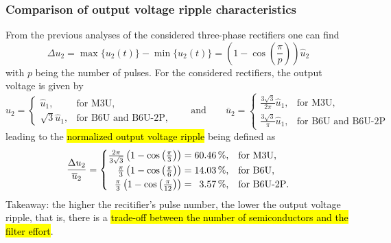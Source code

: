 \begin{frame}
    \frametitle{Comparison of output voltage ripple characteristics}
    From the previous analyses of the considered three-phase rectifiers one can find
    \begin{equation}
        \Delta u_2 = \max\{u_2(t)\} -\min\{u_2(t)\} = \left(1-\cos\left(\frac{\pi}{p}\right)\right)\hat{u}_2
    \end{equation}
    with $p$ being the number of pulses. For the considered rectifiers, the output voltage is given by
    $$
    \hat{u}_2 = \begin{cases}
        \hat{u}_1, & \text{for M3U},\\
        \sqrt{3}\hat{u}_1, & \text{for B6U and B6U-2P},
    \end{cases} \qquad \mbox{and} \qquad \overline{u}_2 = \begin{cases}
        \frac{3\sqrt{3}}{2\pi}\hat{u}_1, & \text{for M3U},\\
        \frac{3\sqrt{3}}{\pi}\hat{u}_1, & \text{for B6U and B6U-2P}
    \end{cases}
    $$
    leading to the \hl{normalized output voltage ripple} being defined as
    \begin{equation}
            \frac{\Delta u_2}{\overline{u}_2} = \begin{cases}
                \frac{2\pi}{3\sqrt{3}}\left(1-\cos\left(\frac{\pi}{3}\right)\right)=60.46\,\%, & \text{for M3U},\\
                \hfill\frac{\pi}{3}\left(1-\cos\left(\frac{\pi}{6}\right)\right)=14.03\,\%, & \text{for B6U},\\
                \hfill\frac{\pi}{3}\left(1-\cos\left(\frac{\pi}{12}\right)\right)=\hphantom{0}3.57\,\%, & \text{for B6U-2P}. 
            \end{cases}
    \end{equation}
    Takeaway: the higher the recitifier's pulse number, the lower the output voltage ripple, that is, there is a \hl{trade-off between the number of semiconductors and the filter effort}. 
\end{frame}

